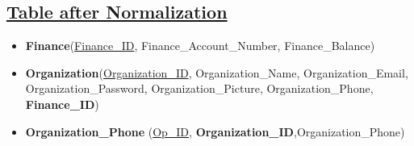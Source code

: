 \subsection*{\underline{Table after Normalization}}
\begin{itemize}
    \item \textbf{Finance}(\underline{Finance\_ID}, Finance\_Account\_Number, Finance\_Balance)
    \item \textbf{Organization}(\underline{Organization\_ID}, Organization\_Name, Organization\_Email, Organization\_Password, Organization\_Picture, Organization\_Phone, \textbf{Finance\_ID})
    \item \textbf{Organization\_Phone} (\underline{Op\_ID}, \textbf{Organization\_ID},{Organization\_Phone})
\end{itemize}

\clearpage